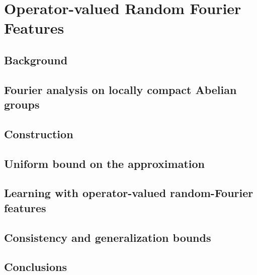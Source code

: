 
\chapter{Operator-valued Random Fourier Features} %
\label{ch:operator-valued_random_fourier_features}

\section{Background}
\label{sec:ch04_background}

\section{Fourier analysis on locally compact Abelian groups}
\label{sec:fourier_analysis_on_locally_compact_abelian_groups}

\section{Construction}
\label{sec:construction}

\section{Uniform bound on the approximation}
\label{sec:uniform_bound_on_the_approximation}

\section{Learning with operator-valued random-Fourier features}
\label{sec:learning_with_operator-valued_random-fourier_features}

\section{Consistency and generalization bounds}
\label{sec:consistency and generalization bounds}

\section{Conclusions}
\label{sec:conclusions}
